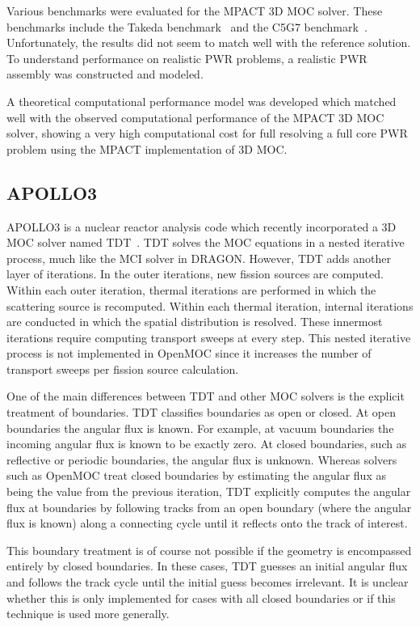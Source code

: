 Various benchmarks were evaluated for the MPACT 3D \ac{MOC} solver. These benchmarks include the Takeda benchmark~\cite{takeda} and the C5G7 benchmark~\cite{c5g7}. Unfortunately, the results did not seem to match well with the reference solution. To understand performance on realistic \ac{PWR} problems, a realistic \ac{PWR} assembly was constructed and modeled. 

A theoretical computational performance model was developed which matched well with the observed computational performance of the MPACT 3D \ac{MOC} solver, showing a very high computational cost for full resolving a full core \ac{PWR} problem using the MPACT implementation of 3D \ac{MOC}.

\subsection{APOLLO3}
\label{sec:apollo3}

APOLLO3 is a nuclear reactor analysis code which recently incorporated a 3D \ac{MOC} solver named TDT~\cite{Sciannandrone2016}. TDT solves the \ac{MOC} equations in a nested iterative process, much like the MCI solver in DRAGON. However, TDT adds another layer of iterations. In the outer iterations, new fission sources are computed. Within each outer iteration, thermal iterations are performed in which the scattering source is recomputed. Within each thermal iteration, internal iterations are conducted in which the spatial distribution is resolved. These innermost iterations require computing transport sweeps at every step. This nested iterative process is not implemented in OpenMOC since it increases the number of transport sweeps per fission source calculation. 

One of the main differences between TDT and other \ac{MOC} solvers is the explicit treatment of boundaries. TDT classifies boundaries as open or closed. At open boundaries the angular flux is known. For example, at vacuum boundaries the incoming angular flux is known to be exactly zero. At closed boundaries, such as reflective or periodic boundaries, the angular flux is unknown. Whereas solvers such as OpenMOC treat closed boundaries by estimating the angular flux as being the value from the previous iteration, TDT explicitly computes the angular flux at boundaries by following tracks from an open boundary (where the angular flux is known) along a connecting cycle until it reflects onto the track of interest.

This boundary treatment is of course not possible if the geometry is encompassed entirely by closed boundaries. In these cases, TDT guesses an initial angular flux and follows the track cycle until the initial guess becomes irrelevant. It is unclear whether this is only implemented for cases with all closed boundaries or if this technique is used more generally.

